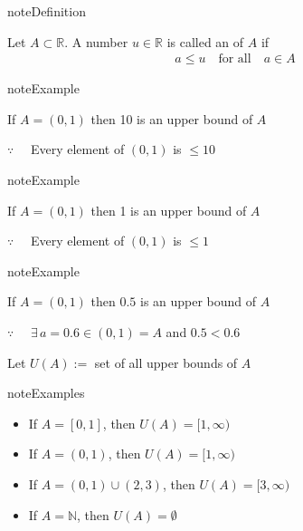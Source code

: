 \documentclass[letterpaper,10pt,english]{jupyterBook}
\begin{document}
\begin{sphinxadmonition}{note}{Definition}

\sphinxAtStartPar
Let \(A \subset \mathbb{R}\).
A number \(u \in \mathbb{R}\) is called an  of \(A\) if
\begin{equation*}
\begin{split}
%
a \leq u \quad \text{for all} \quad a \in A
%
\end{split}
\end{equation*}\end{sphinxadmonition}

\begin{sphinxadmonition}{note}{Example}

\sphinxAtStartPar
If \(A = (0, 1)\) then 10 is an upper bound of \(A\)

\sphinxAtStartPar
\(\because \quad\) Every element of \((0, 1)\) is \(\leq 10\)
\end{sphinxadmonition}

\begin{sphinxadmonition}{note}{Example}

\sphinxAtStartPar
If \(A = (0, 1)\) then 1 is an upper bound of \(A\)

\sphinxAtStartPar
\(\because \quad\) Every element of \((0, 1)\) is \(\leq 1\)
\end{sphinxadmonition}

\begin{sphinxadmonition}{note}{Example}

\sphinxAtStartPar
If \(A = (0, 1)\) then \(0.5\) is  an upper bound of \(A\)

\sphinxAtStartPar
\(\because \quad\) \(\exists\, a = 0.6 \in (0, 1) = A\) and \(0.5 < 0.6\)
\end{sphinxadmonition}

\sphinxAtStartPar
Let \(U(A) :=\) set of all upper bounds of \(A\)

\begin{figure}[htbp]
\centering

\noindent{}
\end{figure}

\begin{sphinxadmonition}{note}{Examples}
\begin{itemize}
\item {} 
\sphinxAtStartPar
If \(A = [0, 1]\), then \(U(A) = [1, \infty)\)

\item {} 
\sphinxAtStartPar
If \(A = (0, 1)\), then \(U(A) = [1, \infty)\)

\item {} 
\sphinxAtStartPar
If \(A = (0, 1) \cup (2, 3)\), then \(U(A) = [3, \infty)\)

\item {} 
\sphinxAtStartPar
If \(A = \mathbb{N}\), then \(U(A) = \emptyset\)

\end{itemize}
\end{sphinxadmonition}
\end{document}
